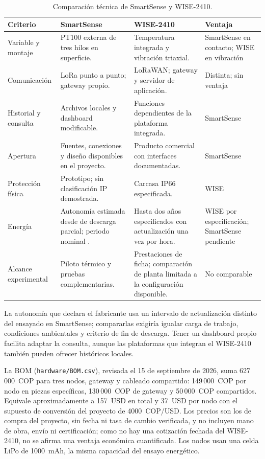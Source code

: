 \begin{table}[htbp]
\centering
\caption{Comparación técnica de SmartSense y WISE-2410.}
\label{tab:wise-smartsense}
\small
\begin{tabularx}{\textwidth}{@{}>{\raggedright\arraybackslash}p{2.6cm}XX>{\raggedright\arraybackslash}p{2.4cm}@{}}
\toprule
Criterio & SmartSense & WISE-2410 & Ventaja \\
\midrule
Variable y montaje & PT100 externa de tres hilos en superficie. & Temperatura integrada y vibración triaxial. & SmartSense en contacto; WISE en vibración \\
Comunicación & LoRa punto a punto; gateway propio. & LoRaWAN; gateway y servidor de aplicación. & Distinta; sin ventaja \\
Historial y consulta & Archivos locales y dashboard modificable. & Funciones dependientes de la plataforma integrada. & SmartSense \\
Apertura & Fuentes, conexiones y diseño disponibles en el proyecto. & Producto comercial con interfaces documentadas. & SmartSense \\
Protección física & Prototipo; sin clasificación IP demostrada. & Carcasa IP66 especificada. & WISE \\
Energía & Autonomía estimada desde \DuracionDescarga{} de descarga parcial; periodo nominal \PeriodoNominal{}. & Hasta dos años especificados con actualización una vez por hora. & WISE por especificación; SmartSense pendiente \\
Alcance experimental & Piloto térmico y pruebas complementarias. & Prestaciones de ficha; comparación de planta limitada a la configuración disponible. & No comparable \\
\bottomrule
\end{tabularx}
\end{table}

La autonomía que declara el fabricante usa un intervalo de actualización distinto del ensayado en SmartSense; compararlas exigiría igualar carga de trabajo, condiciones ambientales y criterio de fin de descarga. Tener un dashboard propio facilita adaptar la consulta, aunque las plataformas que integran el WISE-2410 también pueden ofrecer históricos locales.

La BOM (\texttt{hardware/BOM.csv}), revisada el 15 de septiembre de 2026, suma 627\,000~COP para tres nodos, gateway y cableado compartido: 149\,000~COP por nodo en piezas específicas, 130\,000~COP de gateway y 50\,000~COP compartidos. Equivale aproximadamente a 157~USD en total y 37~USD por nodo con el supuesto de conversión del proyecto de 4000~COP/USD. Los precios son los de compra del proyecto, sin fecha ni tasa de cambio verificada, y no incluyen mano de obra, envío ni certificación; como no hay una cotización fechada del WISE-2410, no se afirma una ventaja económica cuantificada. Los nodos usan una celda LiPo de 1000~mAh, la misma capacidad del ensayo energético.


